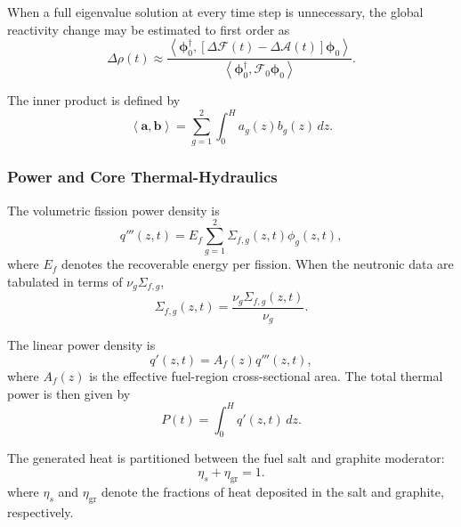 \documentclass[a4paper,12pt]{article}
\begin{document}
When a full eigenvalue solution at every time step is unnecessary, the
global reactivity change may be estimated to first order as
\begin{equation}
\Delta\rho(t)
\approx
\frac{
\left\langle
\boldsymbol{\phi}_{0}^{\dagger},
\left[
\Delta\mathcal{F}(t)
-
\Delta\mathcal{A}(t)
\right]
\boldsymbol{\phi}_{0}
\right\rangle
}
{
\left\langle
\boldsymbol{\phi}_{0}^{\dagger},
\mathcal{F}_{0}\boldsymbol{\phi}_{0}
\right\rangle
}.
\label{eq:perturbation_reactivity}
\end{equation}

The inner product is defined by
\begin{equation}
\left\langle
\mathbf{a},\mathbf{b}
\right\rangle
=
\sum_{g=1}^{2}
\int_{0}^{H}
a_g(z)b_g(z)\,dz.
\label{eq:inner_product}
\end{equation}

\subsubsection{Power and Core Thermal-Hydraulics}

The volumetric fission power density is
\begin{equation}
q'''(z,t)
=
E_f
\sum_{g=1}^{2}
\Sigma_{f,g}(z,t)\phi_g(z,t),
\label{eq:volumetric_power}
\end{equation}
where $E_f$ denotes the recoverable energy per fission. When the neutronic
data are tabulated in terms of $\nu_g\Sigma_{f,g}$,
\begin{equation}
\Sigma_{f,g}(z,t)
=
\frac{\nu_g\Sigma_{f,g}(z,t)}{\nu_g}.
\label{eq:sigmaf_from_nusigmaf}
\end{equation}

The linear power density is
\begin{equation}
q'(z,t)
=
A_f(z)q'''(z,t),
\label{eq:linear_power}
\end{equation}
where $A_f(z)$ is the effective fuel-region cross-sectional area. The
total thermal power is then given by
\begin{equation}
P(t)
=
\int_{0}^{H}
q'(z,t)\,dz.
\label{eq:total_power}
\end{equation}

The generated heat is partitioned between the fuel salt and graphite
moderator:
\begin{equation}
\eta_s+\eta_{\mathrm{gr}}=1.
\label{eq:heat_split}
\end{equation}
where $\eta_s$ and $\eta_{\mathrm{gr}}$ denote the fractions of heat
deposited in the salt and graphite, respectively.
\end{document}
